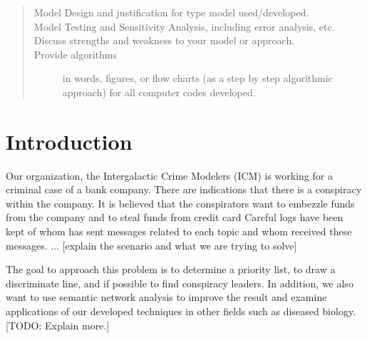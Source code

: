 \documentclass{icmmcm}
\begin{document}
\begin{summary}
\begin{quotation}
\begin{description}
\item[Model Design and justification for type model used/developed.]

\item[Model Testing and Sensitivity Analysis, including error
  analysis, etc.]

\item[Discuss strengths and weakness to your model or approach.]

\item[Provide algorithms] in words, figures, or flow charts (as a step
  by step algorithmic approach) for all computer codes developed.
\end{description}
 \citep{comap-mcm-rules}
\end{quotation}

\end{summary}
 


\maketitle
\tableofcontents

\listoffigures
\listoftables  
 

\section{Introduction}%
\label{sec:introduction}


Our organization, the Intergalactic Crime Modelers (ICM) is working
for a criminal case of a bank company.  There are indications that  there is a conspiracy within the company.  
It is believed that the conspirators want to embezzle funds from the company and to steal funds from credit card 
Careful logs have been kept of whom has sent messages related to each topic and whom received these messages.
... [explain the scenario and what we are trying to solve]

The goal to approach this problem is to determine a priority list, 
to draw a discriminate line, and if possible to find
conspiracy leaders. In addition, we also want to use semantic
network analysis to improve the result and examine applications of
our developed techniques in other fields such as diseased biology.
[TODO: Explain more.]
\end{document}
